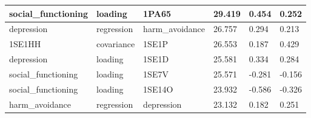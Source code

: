 \documentclass[11pt]{article}
\begin{document}
\begin{table}[h!]
{\begin{tabular}{|l|l|l|l|l|l|}
social\_functioning     & loading            & 1PA65                   & 29.419                                                                & 0.454                                                                        & 0.252                                                                               \\ \hline
depression              & regression         & harm\_avoidance          & 26.757                                                                & 0.294                                                                        & 0.213                                                                               \\ \hline
1SE1HH                 & covariance         & 1SE1P                   & 26.553                                                                & 0.187                                                                        & 0.429                                                                               \\ \hline
depression              & loading            & 1SE1D                   & 25.581                                                                & 0.334                                                                        & 0.284                                                                               \\ \hline
social\_functioning     & loading            & 1SE7V                   & 25.571                                                                & -0.281                                                                       & -0.156                                                                              \\ \hline
social\_functioning     & loading            & 1SE14O                  & 23.932                                                                & -0.586                                                                       & -0.326                                                                              \\ \hline
harm\_avoidance         & regression         & depression               & 23.132                                                                & 0.182                                                                        & 0.251                                                                               \\ \hline
\end{tabular}
}
\end{table}
\end{document}
